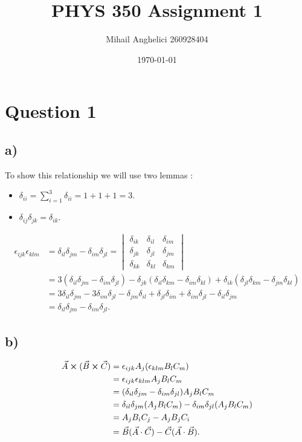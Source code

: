 \documentclass[
	12pt,
	]{article}
\title{PHYS 350 Assignment 1}
\author{Mihail Anghelici 260928404 }
\date{\today}
\newcommand{\ep}{\epsilon}
\newcommand{\de}{\delta}
\theoremstyle{definition}
\theoremstyle{definition}
\theoremstyle{definition}
\theoremstyle{definition}
\theoremstyle{definition}
\theoremstyle{example}
\theoremstyle{note}
\theoremstyle{remark}
\theoremstyle{example}
\begin{document}
	\maketitle
		\section*{Question 1 }
			\subsection*{a) }
			To show this relationship we will use two lemmas :
			\begin{itemize}
				\item $\de_{ii} = \sum_{i=1}^{3}\de_{ii} = 1+1+1 = 3.$
				\item $\de_{ij}\de_{jk} = \de_{ik}.$
			\end{itemize}
				\begin{align*}
					\epsilon_{ijk}\epsilon_{klm} &= \de_{il}\de_{jm}-\de_{im}\de_{jl} = \begin{vmatrix}
						\de_{ik} & \de_{il} &\de_{im} \\
						\de_{jk} & \de_{jl} &\de_{jm} \\
						\de_{kk} & \de_{kl} &\de_{km}
					\end{vmatrix} \\
					&= 3(\de_{il}\de_{jm} -\de_{im}\de_{jl})-\de_{jk}(\de_{il}\de_{km}-\de_{im}\de_{kl}) + \de_{ik}(\de_{jl}\de_{km} - \de_{jm}\de_{kl}) \\
					&=3\de_{il}\de_{jm}-3\de_{im}\de_{jl} -\de_{jm}\de_{il}+\de_{jl}\de_{im}+\de_{im}\de_{jl}-\de_{il}\de_{jm}\\
					&= \de_{il}\de_{jm}-\de_{im}\de_{jl}.
				\end{align*}
			\subsection*{b) }
				\begin{align*}
					\vec{A}\cross (\vec{B}\cross \vec{C}) &= \ep_{ijk}A_{j}(\ep_{klm}B_{l}C_{m})\\
					&=\ep_{ijk}\ep_{klm}A_{j}B_{l}C_{m} \\
					&=(\de_{il}\de_{jm}-\de_{im}\de_{jl})A_{j}B_{l}C_{m}\\
					&=\de_{il}\de_{jm}(A_{j}B_{l}C_{m}) - \de_{im}\de_{jl}(A_{j}B_{l}C_{m})\\
					&=A_{j}B_{i}C_{j} - A_{j}B_{j}C_{i} \\
					&= \vec{B}(\vec{A}\cdot\vec{C}) - \vec{C}(\vec{A}\cdot \vec{B}).
				\end{align*}
\end{document}
